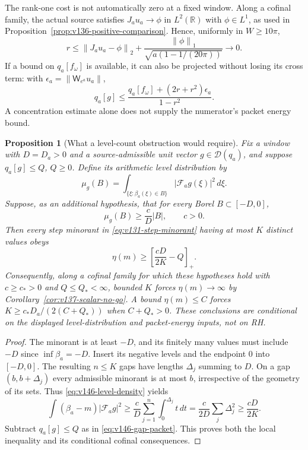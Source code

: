 \documentclass[11pt]{article}
\newtheorem{proposition}[theorem]{Proposition}
\theoremstyle{remark}
\newcommand{\norm}[1]{\left\lVert #1\right\rVert}
\begin{document}
The rank-one cost is not automatically zero at a fixed window. Along
a cofinal family, the actual source satisfies $J_au_a\to\phi$ in
$L^2(\mathbb R)$ with $\phi\in L^1$, as used in
Proposition~\ref{prop:v136-positive-comparison}. Hence, uniformly in
$W\ge10\pi$,
\[
 r\le\norm{J_au_a-\phi}_2
       +\frac{\norm\phi_1}{\sqrt{a(1-1/(20\pi))}}\longrightarrow0.
\]
If a bound on $q_a[f_\omega]$ is available, it can also be projected
without losing its cross term: with
$\epsilon_a=\norm{\mathsf W_{e^a}u_a}$,
\[
 q_a[g]\le\frac{q_a[f_\omega]+(2r+r^2)\epsilon_a}{1-r^2}.
\]
A concentration estimate alone does not supply the numerator's packet
energy bound.

\begin{proposition}[What a level-count obstruction would require]
\label{prop:v146-level-complexity}
Fix a window with $D=D_a>0$ and a source-admissible unit vector
$g\in\mathcal D(q_a)$, and suppose $q_a[g]\le Q$, $Q\ge0$.
Define its arithmetic level distribution by
\[
 \mu_g(B)=\int_{\{\xi:\beta_a(\xi)\in B\}}
                      |\mathcal F_ag(\xi)|^2\,d\xi.
\]
Suppose, as an additional hypothesis, that for every Borel
$B\subset[-D,0]$,
\begin{equation}\label{eq:v146-level-density}
 \mu_g(B)\ge\frac{c}{D}|B|,\qquad c>0.
\end{equation}
Then every step minorant in \eqref{eq:v131-step-minorant} having at
most $K$ distinct values obeys
\begin{equation}\label{eq:v146-level-lower}
 \eta(m)\ge\left[\frac{cD}{2K}-Q\right]_+.
\end{equation}
Consequently, along a cofinal family for which these hypotheses hold
with $c\ge c_*>0$ and $Q\le Q_*<\infty$, bounded $K$ forces
$\eta(m)\to\infty$ by Corollary~\ref{cor:v137-scalar-no-go}.
A bound $\eta(m)\le C$ forces
$K\ge c_*D_a/(2(C+Q_*))$ when $C+Q_*>0$.
These conclusions are conditional on the displayed level-distribution
and packet-energy inputs, not on RH.
\end{proposition}
\begin{proof}
The minorant is at least $-D$, and its finitely many values must include
$-D$ since $\inf\beta_a=-D$. Insert its negative levels and the endpoint
$0$ into $[-D,0]$. The resulting $n\le K$ gaps have lengths
$\Delta_j$ summing to $D$. On a gap $(b,b+\Delta_j)$ every admissible
minorant is at most $b$, irrespective of the geometry of its sets.
Thus \eqref{eq:v146-level-density} yields
\[
 \int(\beta_a-m)|\mathcal F_ag|^2
 \ge\frac{c}{D}\sum_{j=1}^n\int_0^{\Delta_j}t\,dt
 =\frac{c}{2D}\sum_j\Delta_j^2\ge\frac{cD}{2K}.
\]
Subtract $q_a[g]\le Q$ as in \eqref{eq:v146-gap-packet}. This proves
both the local inequality and its conditional cofinal consequences.
\end{proof}
\end{document}
